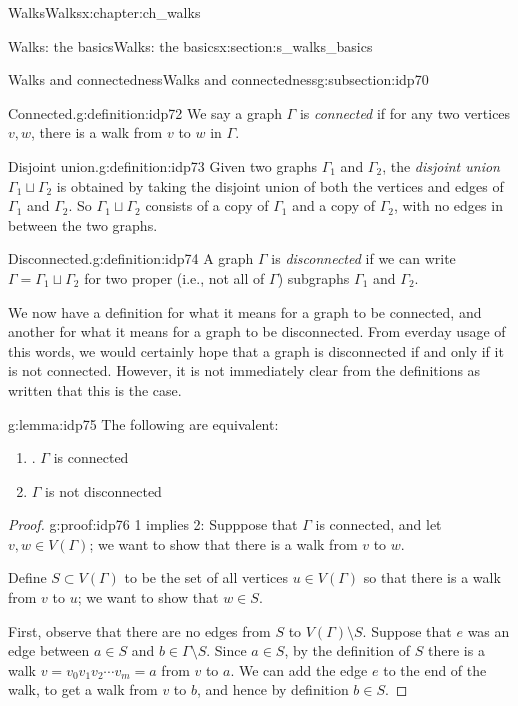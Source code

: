 \documentclass[oneside,10pt,]{book}
\numberwithin{equation}{section}
\begin{document}
\begin{chapterptx}{Walks}{}{Walks}{}{}{x:chapter:ch_walks}
\begin{sectionptx}{Walks: the basics}{}{Walks: the basics}{}{}{x:section:s_walks_basics}
\begin{subsectionptx}{Walks and connectedness}{}{Walks and connectedness}{}{}{g:subsection:idp70}
\begin{definition}{Connected.}{g:definition:idp72}
We say a graph \(\Gamma\) is \emph{connected} if for any two vertices \(v,w\), there is a walk from \(v\) to \(w\) in \(\Gamma\).%
\end{definition}
\begin{definition}{Disjoint union.}{g:definition:idp73}%
Given two graphs \(\Gamma_1\) and \(\Gamma_2\), the \emph{disjoint union} \(\Gamma_1\sqcup \Gamma_2\) is obtained by taking the disjoint union of both the vertices and edges of \(\Gamma_1\) and \(\Gamma_2\).  So \(\Gamma_1\sqcup\Gamma_2\) consists of a copy of \(\Gamma_1\) and a copy of \(\Gamma_2\), with no edges in between the two graphs.%
\end{definition}
\begin{definition}{Disconnected.}{g:definition:idp74}%
A graph \(\Gamma\) is \emph{disconnected} if we can write \(\Gamma=\Gamma_1\sqcup \Gamma_2\) for two proper (i.e., not all of \(\Gamma\)) subgraphs \(\Gamma_1\) and \(\Gamma_2\).%
\end{definition}
We now have a definition for what it means for a graph to be connected, and another for what it means for a graph to be disconnected.  From everday usage of this words, we would certainly hope that a graph is disconnected if and only if it is not connected.  However, it is not immediately clear from the definitions as written that this is the case.%
\begin{lemma}{}{}{g:lemma:idp75}%
The following are equivalent:%
%
\begin{enumerate}
\item{}. \(\Gamma\) is connected%
\item{}\(\Gamma\) is not disconnected%
\end{enumerate}
\end{lemma}
\begin{proof}{}{g:proof:idp76}
1 implies 2: Supppose that \(\Gamma\) is connected, and let \(v, w\in V(\Gamma)\); we want to show that there is a walk from \(v\) to \(w\).%
\par
Define \(S\subset V(\Gamma)\) to be the set of all vertices \(u\in V(\Gamma)\) so that there is a walk from \(v\) to \(u\); we want to show that \(w\in S\).%
\par
First, observe that there are no edges from \(S\) to \(V(\Gamma)\setminus S\).  Suppose that \(e\) was an edge between \(a\in S\) and \(b\in\Gamma\setminus S\).  Since \(a\in S\), by the definition of \(S\) there is a walk \(v=v_0v_1v_2\cdots v_m=a\) from \(v\) to \(a\).  We can add the edge \(e\) to the end of the walk, to get a walk from \(v\) to \(b\), and hence by definition \(b\in S\).%

\end{proof}
\end{subsectionptx}
\end{sectionptx}
\end{chapterptx}
\end{document}
